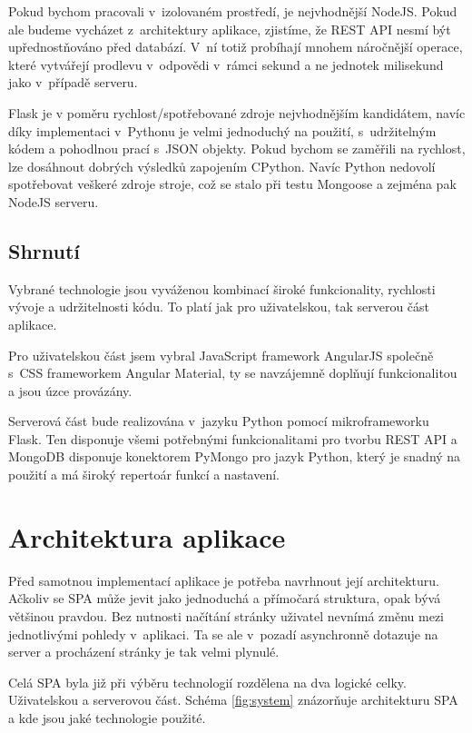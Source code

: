 Pokud bychom pracovali v~izolovaném prostředí, je nejvhodnější NodeJS. Pokud ale budeme vycházet z~architektury aplikace, zjistíme, že REST API nesmí být upřednostňováno před databází. V~ní totiž probíhají mnohem náročnější operace, které vytvářejí prodlevu v~odpovědi v~rámci sekund a ne jednotek milisekund jako v~případě serveru. 

Flask je v poměru rychlost/spotřebované zdroje nejvhodnějším kandidátem, navíc díky implementaci v~Pythonu je velmi jednoduchý na použití, s~udržitelným kódem a pohodlnou prací s~JSON objekty. Pokud bychom se zaměřili na rychlost, lze dosáhnout dobrých výsledků zapojením CPython. Navíc Python nedovolí spotřebovat veškeré zdroje stroje, což se stalo při testu Mongoose a zejména pak NodeJS serveru.

\section{Shrnutí}

Vybrané technologie jsou vyváženou kombinací široké funkcionality, rychlosti vývoje a udržitelnosti kódu. To platí jak pro uživatelskou, tak serverou část aplikace.

Pro uživatelskou část jsem vybral JavaScript framework AngularJS společně s~CSS frameworkem Angular Material, ty se navzájemně doplňují funkcionalitou a jsou úzce provázány.

Serverová část bude realizována v~jazyku Python pomocí mikroframeworku Flask. Ten disponuje všemi potřebnými funkcionalitami pro tvorbu REST API a MongoDB disponuje konektorem PyMongo pro jazyk Python, který je snadný na použití a má široký repertoár funkcí a nastavení.

\chapter{Architektura aplikace}
\label{architektura}

Před samotnou implementací aplikace je potřeba navrhnout její architekturu. Ačkoliv se SPA může jevit jako jednoduchá a přímočará struktura, opak bývá většinou pravdou. Bez nutnosti načítání stránky uživatel nevnímá změnu mezi jednotlivými pohledy v~aplikaci. Ta se ale v~pozadí asynchronně dotazuje na server a procházení stránky je tak velmi plynulé.

Celá SPA byla již při výběru technologií rozdělena na dva logické celky. Uživatelskou a serverovou část. Schéma \ref{fig:system} znázorňuje architekturu SPA a kde jsou jaké technologie použité.

